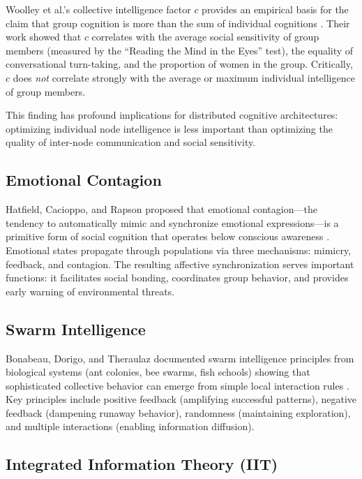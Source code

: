 \documentclass[11pt,a4paper]{article}
\begin{document}
Woolley et al.'s collective intelligence factor $c$ provides an empirical basis for the claim that group cognition is more than the sum of individual cognitions \citep{woolley2010}. Their work showed that $c$ correlates with the average social sensitivity of group members (measured by the ``Reading the Mind in the Eyes'' test), the equality of conversational turn-taking, and the proportion of women in the group. Critically, $c$ does \emph{not} correlate strongly with the average or maximum individual intelligence of group members.

This finding has profound implications for distributed cognitive architectures: optimizing individual node intelligence is less important than optimizing the quality of inter-node communication and social sensitivity.

\subsection{Emotional Contagion}

Hatfield, Cacioppo, and Rapson proposed that emotional contagion---the tendency to automatically mimic and synchronize emotional expressions---is a primitive form of social cognition that operates below conscious awareness \citep{hatfield1993}. Emotional states propagate through populations via three mechanisms: mimicry, feedback, and contagion. The resulting affective synchronization serves important functions: it facilitates social bonding, coordinates group behavior, and provides early warning of environmental threats.

\subsection{Swarm Intelligence}

Bonabeau, Dorigo, and Theraulaz documented swarm intelligence principles from biological systems (ant colonies, bee swarms, fish schools) showing that sophisticated collective behavior can emerge from simple local interaction rules \citep{bonabeau1999}. Key principles include positive feedback (amplifying successful patterns), negative feedback (dampening runaway behavior), randomness (maintaining exploration), and multiple interactions (enabling information diffusion).

\subsection{Integrated Information Theory (IIT)}
\end{document}
